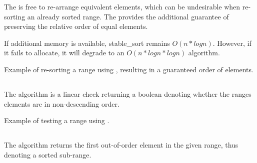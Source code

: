 The  is free to re-arrange equivalent elements, which can be undesirable when re-sorting an already sorted range. The  provides the additional guarantee of preserving the relative order of equal elements.


If additional memory is available, stable\_sort remains $O(n*logn)$. However, if it fails to allocate, it will degrade to an $O(n*logn*logn)$ algorithm.

\begin{box-note}
\footnotesize Example of re-sorting a range using , resulting in a guaranteed order of elements.
\tcblower
{}
\end{box-note}

\subsection{\texorpdfstring{}{\texttt{std::is\_sorted}}}

The  algorithm is a linear check returning a boolean denoting whether the ranges elements are in non-descending order.


\begin{box-note}
\footnotesize Example of testing a range using .
\tcblower
{}
\end{box-note}

\subsection{\texorpdfstring{}{\texttt{std::is\_sorted\_until}}}

The  algorithm returns the first out-of-order element in the given range, thus denoting a sorted sub-range.


